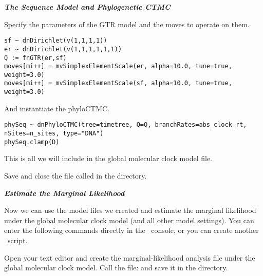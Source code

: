 \textbf{\textit{The Sequence Model and Phylogenetic CTMC}}

Specify the parameters of the GTR model and the moves to operate on them.
{\tt \begin{snugshade*}
\begin{lstlisting}
sf ~ dnDirichlet(v(1,1,1,1))
er ~ dnDirichlet(v(1,1,1,1,1,1))
Q := fnGTR(er,sf)
moves[mi++] = mvSimplexElementScale(er, alpha=10.0, tune=true, weight=3.0)
moves[mi++] = mvSimplexElementScale(sf, alpha=10.0, tune=true, weight=3.0)
\end{lstlisting}
\end{snugshade*}}

And instantiate the phyloCTMC.
{\tt \begin{snugshade*}
\begin{lstlisting}
phySeq ~ dnPhyloCTMC(tree=timetree, Q=Q, branchRates=abs_clock_rt, nSites=n_sites, type="DNA")
phySeq.clamp(D)
\end{lstlisting}
\end{snugshade*}}

This is all we will include in the global molecular clock model file. 

{\begin{framed}
Save and close the file called {\textcolor{red}{}} in the  directory.
\end{framed}}



%

\textbf{\textit{Estimate the Marginal Likelihood}}

Now we can use the model files we created and estimate the marginal likelihood under the global molecular clock model (and all other model settings). 
You can enter the following commands directly in the \RevBayes~console, or you can create another \Rev~script. 

{\begin{framed}
Open your text editor and create the marginal-likelihood analysis file under the global molecular clock model. Call the file: {\textcolor{red}{}} and save it in the  directory.
\end{framed}}


